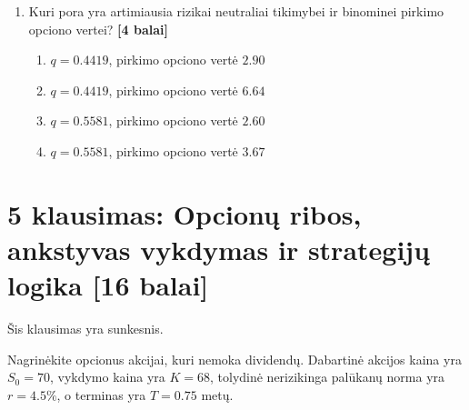 \documentclass[11pt]{article}
\newcommand{\pts}[1]{\hspace{0.35em}\textnormal{\textbf{[#1 balai]}}}
\newenvironment{choices}{\begin{enumerate}[label=\Alph*.,leftmargin=2.2em,itemsep=0.12em,topsep=0.12em]}{\end{enumerate}}
\begin{document}
\begin{enumerate}
    \item Kuri pora yra artimiausia rizikai neutraliai tikimybei ir binominei
    pirkimo opciono vertei? \pts{4}
    \begin{choices}
        \item $q=0.4419$, pirkimo opciono vertė $2.90$
        \item $q=0.4419$, pirkimo opciono vertė $6.64$
        \item $q=0.5581$, pirkimo opciono vertė $2.60$
        \item $q=0.5581$, pirkimo opciono vertė $3.67$
    \end{choices}
\end{enumerate}

\section*{5 klausimas: Opcionų ribos, ankstyvas vykdymas ir strategijų logika \pts{16}}

Šis klausimas yra sunkesnis.

Nagrinėkite opcionus akcijai, kuri nemoka dividendų. Dabartinė akcijos kaina yra
$S_0=70$, vykdymo kaina yra $K=68$, tolydinė nerizikinga palūkanų norma yra
$r=4.5\%$, o terminas yra $T=0.75$ metų.
\end{document}
